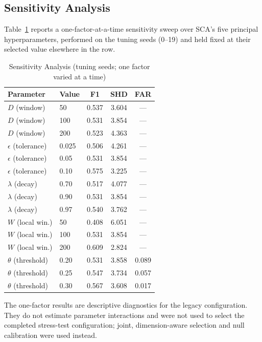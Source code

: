 \documentclass{ieeeaccess}
\begin{document}
\subsection{Sensitivity Analysis}
\label{res:sens}
Table~\ref{tab:sens} reports a one-factor-at-a-time sensitivity sweep over SCA's five principal hyperparameters, performed on the tuning seeds (0--19) and held fixed at their selected value elsewhere in the row.

\begin{table}[!t]
\caption{Sensitivity Analysis (tuning seeds; one factor varied at a time)}
\label{tab:sens}
\centering
\footnotesize
\setlength{\tabcolsep}{5pt}
\begin{tabular}{llccc}
\toprule
\textbf{Parameter} & \textbf{Value} & \textbf{F1} & \textbf{SHD} & \textbf{FAR}\\
\midrule
$D$ (window)      & 50    & 0.537 & 3.604 & ---\\
$D$ (window)      & 100   & 0.531 & 3.854 & ---\\
$D$ (window)      & 200   & 0.523 & 4.363 & ---\\
\addlinespace[2pt]
$\epsilon$ (tolerance) & 0.025 & 0.506 & 4.261 & ---\\
$\epsilon$ (tolerance) & 0.05  & 0.531 & 3.854 & ---\\
$\epsilon$ (tolerance) & 0.10  & 0.575 & 3.225 & ---\\
\addlinespace[2pt]
$\lambda$ (decay) & 0.70  & 0.517 & 4.077 & ---\\
$\lambda$ (decay) & 0.90  & 0.531 & 3.854 & ---\\
$\lambda$ (decay) & 0.97  & 0.540 & 3.762 & ---\\
\addlinespace[2pt]
$W$ (local win.)  & 50    & 0.408 & 6.051 & ---\\
$W$ (local win.)  & 100   & 0.531 & 3.854 & ---\\
$W$ (local win.)  & 200   & 0.609 & 2.824 & ---\\
\addlinespace[2pt]
$\theta$ (threshold) & 0.20 & 0.531 & 3.858 & 0.089\\
$\theta$ (threshold) & 0.25 & 0.547 & 3.734 & 0.057\\
$\theta$ (threshold) & 0.30 & 0.567 & 3.608 & 0.017\\
\bottomrule
\end{tabular}
\end{table}

The one-factor results are descriptive diagnostics for the legacy configuration. They do not estimate parameter interactions and were not used to select the completed stress-test configuration; joint, dimension-aware selection and null calibration were used instead.
\end{document}
